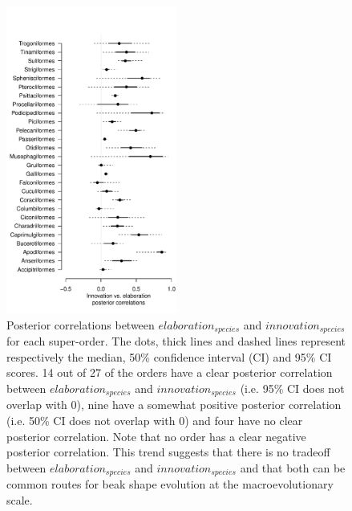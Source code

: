 \documentclass[12pt,letterpaper]{article}
\begin{document}
\begin{figure}[!htbp]
\centering
   \includegraphics[width=0.5\textwidth]{Figures/correlations_fable_orders.pdf}
\caption{Posterior correlations between $elaboration_{species}$ and $innovation_{species}$ for each super-order. The dots, thick lines and dashed lines represent respectively the median, 50\% confidence interval (CI) and 95\% CI scores. 14 out of 27 of the orders have a clear posterior correlation between $elaboration_{species}$ and $innovation_{species}$ (i.e. 95\% CI does not overlap with 0), nine have a somewhat positive posterior correlation (i.e. 50\% CI does not overlap with 0) and four have no clear posterior correlation. Note that no order has a clear negative posterior correlation. This trend suggests that there is no tradeoff between $elaboration_{species}$ and $innovation_{species}$ and that both can be common routes for beak shape evolution at the macroevolutionary scale.
}
\label{fable_correlations}
\end{figure}
\bigskip

\end{document}
